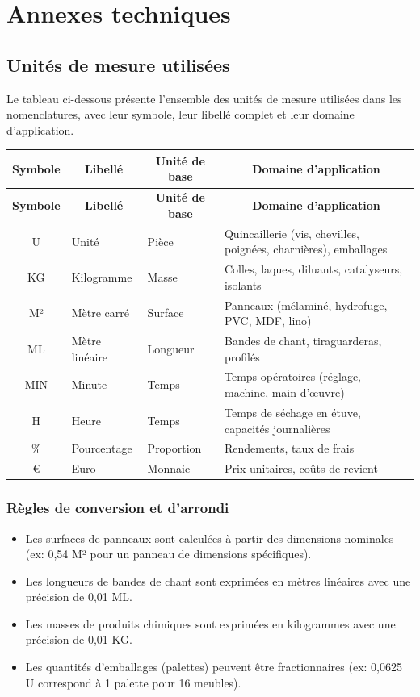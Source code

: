\documentclass[12pt,a4paper]{article}
\begin{document}
\section{Annexes techniques}

\subsection{Unités de mesure utilisées}

Le tableau ci-dessous présente l'ensemble des unités de mesure utilisées dans les nomenclatures, avec leur symbole, leur libellé complet et leur domaine d'application.

\begin{longtable}{|c|p{4cm}|p{4cm}|p{5cm}|}
\hline
\multicolumn{1}{|c|}{\textbf{Symbole}} & \multicolumn{1}{c|}{\textbf{Libellé}} & \multicolumn{1}{c|}{\textbf{Unité de base}} & \multicolumn{1}{c|}{\textbf{Domaine d'application}} \\
\hline
\endfirsthead
\hline
\multicolumn{1}{|c|}{\textbf{Symbole}} & \multicolumn{1}{c|}{\textbf{Libellé}} & \multicolumn{1}{c|}{\textbf{Unité de base}} & \multicolumn{1}{c|}{\textbf{Domaine d'application}} \\
\hline
\endhead
\hline
\endfoot
U & Unité & Pièce & Quincaillerie (vis, chevilles, poignées, charnières), emballages \\
KG & Kilogramme & Masse & Colles, laques, diluants, catalyseurs, isolants \\
M² & Mètre carré & Surface & Panneaux (mélaminé, hydrofuge, PVC, MDF, lino) \\
ML & Mètre linéaire & Longueur & Bandes de chant, tiraguarderas, profilés \\
MIN & Minute & Temps & Temps opératoires (réglage, machine, main-d'œuvre) \\
H & Heure & Temps & Temps de séchage en étuve, capacités journalières \\
\% & Pourcentage & Proportion & Rendements, taux de frais \\
€ & Euro & Monnaie & Prix unitaires, coûts de revient \\
\hline
\end{longtable}

\subsubsection{Règles de conversion et d'arrondi}

\begin{itemize}
    \item Les surfaces de panneaux sont calculées à partir des dimensions nominales (ex: 0,54 M² pour un panneau de dimensions spécifiques).
    \item Les longueurs de bandes de chant sont exprimées en mètres linéaires avec une précision de 0,01 ML.
    \item Les masses de produits chimiques sont exprimées en kilogrammes avec une précision de 0,01 KG.
    \item Les quantités d'emballages (palettes) peuvent être fractionnaires (ex: 0,0625 U correspond à 1 palette pour 16 meubles).
\end{itemize}
\end{document}
